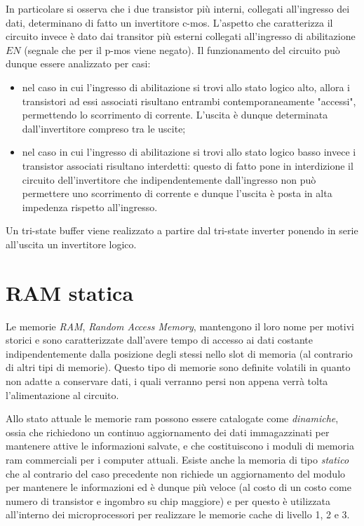 	In particolare si osserva che i due transistor più interni, collegati all'ingresso dei dati, determinano di fatto un invertitore c-mos. L'aspetto che caratterizza il circuito invece è dato dai transitor più esterni collegati all'ingresso di abilitazione $EN$ (segnale che per il p-mos viene negato). Il funzionamento del circuito può dunque essere analizzato per casi:
	\begin{itemize}
		\item nel caso in cui l'ingresso di abilitazione si trovi allo stato logico alto, allora i transistori ad essi associati risultano entrambi contemporaneamente "accessi", permettendo lo scorrimento di corrente. L'uscita è dunque determinata dall'invertitore compreso tra le uscite;
		
		\item nel caso in cui l'ingresso di abilitazione si trovi allo stato logico basso invece i transistor associati risultano interdetti: questo di fatto pone in interdizione il circuito dell'invertitore che indipendentemente dall'ingresso non può permettere uno scorrimento di corrente e dunque l'uscita è posta in alta impedenza rispetto all'ingresso.
	\end{itemize}
	
	Un tri-state buffer viene realizzato a partire dal tri-state inverter ponendo in serie all'uscita un invertitore logico.
	
	
\section{RAM statica}
	Le memorie \textit{RAM}, \textit{Random Access Memory}, mantengono il loro nome per motivi storici e sono caratterizzate dall'avere tempo di accesso ai dati costante indipendentemente dalla posizione degli stessi nello slot di memoria (al contrario di altri tipi di memorie). Questo tipo di memorie sono definite volatili in quanto non adatte a conservare dati, i quali verranno persi non appena verrà tolta l'alimentazione al circuito.
	
	Allo stato attuale le memorie ram possono essere catalogate come \textit{dinamiche}, ossia che richiedono un continuo aggiornamento dei dati immagazzinati per mantenere attive le informazioni salvate, e che costituiscono i moduli di memoria ram commerciali per i computer attuali. Esiste anche la memoria di tipo \textit{statico} che al contrario del caso precedente non richiede un aggiornamento del modulo per mantenere le informazioni ed è dunque più veloce (al costo di un costo come numero di transistor e ingombro su chip maggiore) e per questo è utilizzata all'interno dei microprocessori per realizzare le memorie cache di livello 1, 2 e 3.
	
